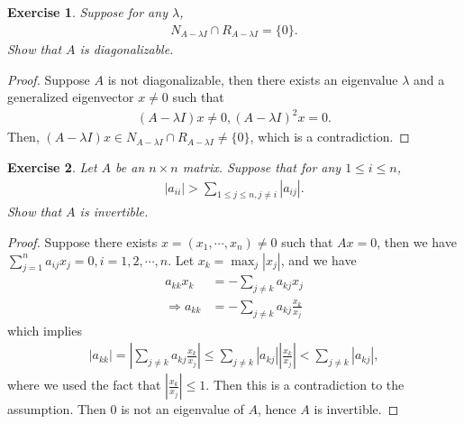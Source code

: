 \documentclass[11pt]{book}
\newtheorem{exercise}{Exercise}[section]
\theoremstyle{definition}
\numberwithin{equation}{chapter}
\begin{document}
\medskip

\begin{exercise}{\bf *}
Suppose for any $\lambda$, 
\begin{align*}
    N_{A - \lambda I} \cap R_{A - \lambda I} = \{0\}.
\end{align*}
Show that $A$ is diagonalizable.
\end{exercise}
\begin{proof}
Suppose $A$ is not diagonalizable, then there exists an eigenvalue $\lambda$ and a generalized eigenvector $x \neq 0$ such that \cite{15}
\begin{align*}
    (A - \lambda I)x \neq 0, (A - \lambda I)^2 x = 0.
\end{align*}
Then, $(A - \lambda I)x \in N_{A - \lambda I} \cap R_{A - \lambda I} \neq \{0\}$, which is a contradiction. 
\end{proof}

\medskip

\begin{exercise}
Let $A$ be an $n\times n$ matrix. Suppose that for any $1 \leq i \leq n$,
\begin{align*}
    |a_{ii}| > \sum_{1\leq j\leq n, j\neq i} |a_{ij}|.
\end{align*}
Show that $A$ is invertible.
\end{exercise}
\begin{proof}
Suppose there exists $x = (x_1,\cdots, x_n) \neq 0$ such that $Ax = 0$, then we have $\sum^n_{j=1} a_{ij}x_j = 0, i = 1,2,\cdots,n$. Let $x_k = \max_{j}|x_j|$, and we have
\begin{align*}
    a_{kk}x_k & = - \sum_{j\neq k}a_{kj} x_j \\
    \Rightarrow a_{kk} & = - \sum_{j\neq k}a_{kj} \frac{x_k}{x_j} 
\end{align*}
which implies 
\begin{align*}
    |a_{kk}| = \left|\sum_{j\neq k}a_{kj} \frac{x_k}{x_j}\right| \leq \sum_{j\neq k} |a_{kj}| \left|\frac{x_k}{x_j}\right| < \sum_{j\neq k} |a_{kj}|,
\end{align*}
where we used the fact that $\left|\frac{x_k}{x_j}\right| \leq 1$. Then this is a contradiction to the assumption. Then $0$ is not an eigenvalue of $A$, hence $A$ is invertible.
\end{proof}

\medskip
\end{document}
